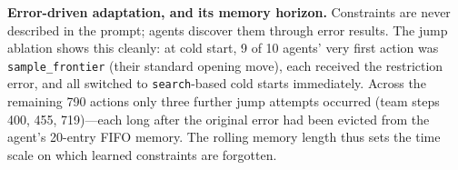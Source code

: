 \documentclass{article} %
\begin{document}
\textbf{Error-driven adaptation, and its memory horizon.} Constraints
are never described in the prompt; agents discover them through error
results. The jump ablation shows this cleanly: at cold start, 9 of 10
agents' very first action was \texttt{sample\_frontier} (their standard
opening move), each received the restriction error, and all switched to
\texttt{search}-based cold starts immediately. Across the remaining 790
actions only three further jump attempts occurred (team steps 400, 455,
719)---each long after the original error had been evicted from the
agent's 20-entry FIFO memory. The rolling memory length thus sets the
time scale on which learned constraints are forgotten.
\end{document}

